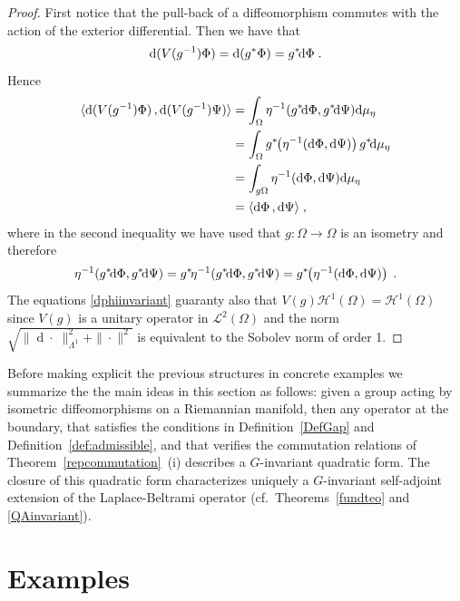 \documentclass[a4paper,12pt]{amsart}
\newcommand{\scalar}[2]{\langle#1\,,#2\rangle}
\newcommand{\norm}[1]{\|#1\|}
\renewcommand{\H}{\mathcal{H}}
\renewcommand{\L}{\mathcal{L}}
\renewcommand{\d}{\mathrm{d}}
\newcommand{\1}{\mathbb{I}}
\numberwithin{equation}{section}
\numberwithin{theorem}{section}
\begin{document}
\begin{proof}
First notice that the pull-back of a diffeomorphism commutes with the action of the exterior differential. 
Then we have that $$\d(V(g^{-1})\Phi)=\d(g^*\Phi)=g^*\negthinspace\d\Phi\;.$$ 
Hence
\begin{subequations}\label{dphiinvariant}
\begin{align}
\scalar{\d(V(g^{-1})\Phi)}{\d(V(g^{-1})\Psi)}&=\int_\Omega \eta^{-1}(g^*\negthinspace\d\Phi,g^*\negthinspace\d\Psi)\d\mu_\eta \nonumber\\
&=\int_\Omega g^*\negthickspace\left( \eta^{-1}(\d\Phi,\d\Psi) \right)g^*\negthinspace\d\mu_\eta \nonumber\\
&=\int_{g\Omega}\eta^{-1}(\d\Phi,\d\Psi)\d\mu_\eta \nonumber\\
&=\scalar{\d\Phi}{\d\Psi}\;,
\end{align}
\end{subequations}
where in the second inequality we have used that $g:\Omega\to\Omega$ is an isometry and therefore 
$$\eta^{-1}(g^*\negthinspace\d\Phi,g^*\negthinspace\d\Psi)=g^*\negthinspace \eta^{-1}(g^*\negthinspace\d\Phi,g^*\negthinspace\d\Psi)
=g^*\negthickspace\left( \eta^{-1}(\d\Phi,\d\Psi) \right)\;.$$ 
The equations \eqref{dphiinvariant} guaranty also that $V(g)\H^1(\Omega)=\H^1(\Omega)$ since $V(g)$
is a unitary operator in $\L^2(\Omega)$ and the norm 
$\sqrt{\norm{\operatorname{d}\cdot\;}_{\Lambda^1}^2+\norm{\cdot}^2}$ is equivalent to the Sobolev norm of order 1.
\end{proof}


Before making explicit the previous structures in concrete examples we summarize the the main ideas in this section as follows: 
given a group acting by isometric diffeomorphisms on a Riemannian manifold, then any operator at the boundary, 
that satisfies the conditions in Definition~\ref{DefGap} and Definition~\ref{def:admissible}, and that verifies the commutation relations of 
Theorem~\ref{repcommutation}~(i) describes a $G$-invariant quadratic form. The closure of this quadratic form characterizes uniquely a 
$G$-invariant self-adjoint extension of the Laplace-Beltrami operator (cf.~Theorems~\ref{fundteo} and \ref{QAinvariant}).





\section{Examples}
\label{sec:SymmetryExamples}
\end{document}

